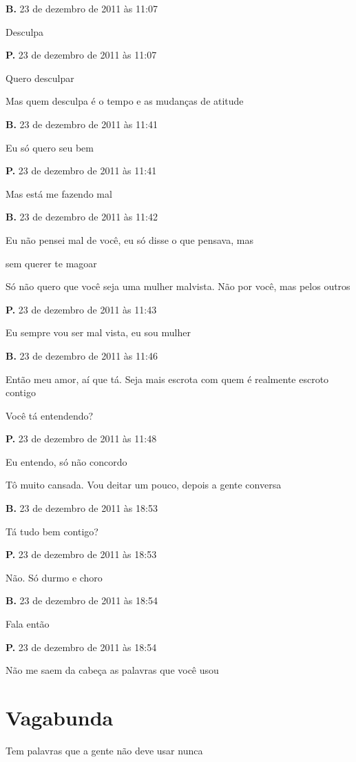 \textbf{B.} 23 de dezembro de 2011 às 11:07

Desculpa

\textbf{P.} 23 de dezembro de 2011 às 11:07

Quero desculpar

Mas quem desculpa é o tempo e as mudanças de atitude

\textbf{B.} 23 de dezembro de 2011 às 11:41

Eu só quero seu bem

\textbf{P.} 23 de dezembro de 2011 às 11:41

Mas está me fazendo mal

\textbf{B.} 23 de dezembro de 2011 às 11:42

Eu não pensei mal de você, eu só disse o que pensava, mas

sem querer te magoar

Só não quero que você seja uma mulher malvista. Não por você, mas pelos
outros

\textbf{P.} 23 de dezembro de 2011 às 11:43

Eu sempre vou ser mal vista, eu sou mulher

\textbf{B.} 23 de dezembro de 2011 às 11:46

Então meu amor, aí que tá. Seja mais escrota com quem é realmente
escroto contigo

Você tá entendendo?

\textbf{P.} 23 de dezembro de 2011 às 11:48

Eu entendo, só não concordo

Tô muito cansada. Vou deitar um pouco, depois a gente conversa

\textbf{B.} 23 de dezembro de 2011 às 18:53

Tá tudo bem contigo?

\textbf{P.} 23 de dezembro de 2011 às 18:53

Não. Só durmo e choro

\textbf{B.} 23 de dezembro de 2011 às 18:54

Fala então

\textbf{P.} 23 de dezembro de 2011 às 18:54

Não me saem da cabeça as palavras que você usou

\chapter{Vagabunda}

Tem palavras que a gente não deve usar nunca

